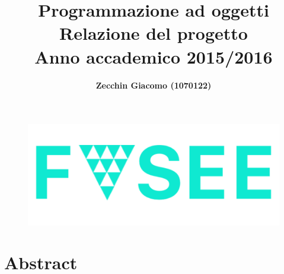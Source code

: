 \documentclass{article}
\begin{document}
\begin{figure}
\centering
\includegraphics[angle=0,scale=.30]{LOGO.png}
\end{figure} 


\title{ \textbf{\Huge Programmazione ad oggetti}\vspace{0.7cm} \\ {\Huge Relazione del progetto} \vspace{0.3cm} \\ {\Large Anno accademico 2015/2016} }
 
\author{\textbf{Zecchin Giacomo (1070122)}}

\maketitle
\thispagestyle{empty}


\pagestyle{fancy}
\lhead{}
\cfoot{}
\renewcommand{\footrulewidth}{0.5pt}

\tableofcontents %



\newpage

\section{Abstract}



	
\end{document}

